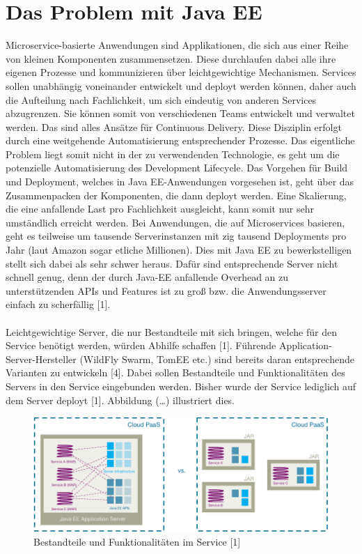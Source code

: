 \section{Das Problem mit Java EE}
Microservice-basierte Anwendungen sind Applikationen, die sich aus einer Reihe von kleinen Komponenten zusammensetzen. Diese durchlaufen dabei alle ihre eigenen Prozesse und kommunizieren über leichtgewichtige Mechanismen. Services sollen unabhängig voneinander entwickelt und deployt werden können, daher auch die Aufteilung nach Fachlichkeit, um sich eindeutig von anderen Services abzugrenzen. Sie können somit von verschiedenen Teams entwickelt und verwaltet werden. Das sind alles Ansätze für Continuous Delivery. Diese Disziplin erfolgt durch eine weitgehende Automatisierung entsprechender Prozesse. Das eigentliche Problem liegt somit nicht in der zu verwendenden Technologie, es geht um die potenzielle Automatisierung des Development Lifecycle. Das Vorgehen für Build und Deployment, welches in Java EE-Anwendungen vorgesehen ist, geht über das Zusammenpacken der Komponenten, die dann deployt werden. Eine Skalierung, die eine anfallende Last pro Fachlichkeit ausgleicht, kann somit nur sehr umständlich erreicht werden. Bei Anwendungen, die auf Microservices basieren, geht es teilweise um tausende Serverinstanzen mit zig tausend Deployments pro Jahr (laut Amazon sogar etliche Millionen). Dies mit Java EE zu bewerkstelligen stellt sich dabei als sehr schwer heraus. Dafür sind entsprechende Server nicht schnell genug, denn der durch Java-EE anfallende Overhead an zu unterstützenden APIs und Features ist zu groß bzw. die Anwendungsserver einfach zu scherfällig [1]. \\ \\
Leichtgewichtige Server, die nur Bestandteile mit sich bringen, welche für den Service benötigt werden, würden Abhilfe schaffen [1]. Führende Application-Server-Hersteller (WildFly Swarm, TomEE etc.) sind bereits daran entsprechende Varianten zu entwickeln [4]. Dabei sollen Bestandteile und Funktionalitäten des Servers in den Service eingebunden werden. Bisher wurde der Service lediglich auf dem Server deployt [1]. Abbildung (…) illustriert dies.
\begin{figure}[h!]
	\centering
	\includegraphics[width=1.0\linewidth]{images/mp}
	\caption{Bestandteile und Funktionalitäten im Service [1]}
	\label{fig:mp}
\end{figure}
